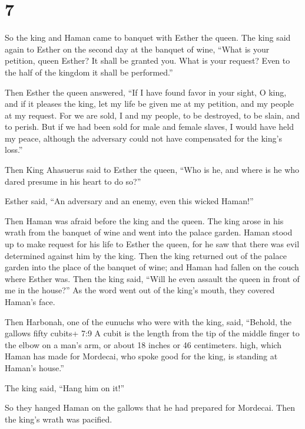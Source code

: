 \hypertarget{section-6}{%
\section{7}\label{section-6}}

 So the king and Haman came to banquet with Esther the
queen.  The king said again to Esther on the second day at
the banquet of wine, ``What is your petition, queen Esther? It shall be
granted you. What is your request? Even to the half of the kingdom it
shall be performed.''

 Then Esther the queen answered, ``If I have found favor in
your sight, O king, and if it pleases the king, let my life be given me
at my petition, and my people at my request.  For we are
sold, I and my people, to be destroyed, to be slain, and to perish. But
if we had been sold for male and female slaves, I would have held my
peace, although the adversary could not have compensated for the king's
loss.''

 Then King Ahasuerus said to Esther the queen, ``Who is he,
and where is he who dared presume in his heart to do so?''

 Esther said, ``An adversary and an enemy, even this wicked
Haman!''

Then Haman was afraid before the king and the queen.  The
king arose in his wrath from the banquet of wine and went into the
palace garden. Haman stood up to make request for his life to Esther the
queen, for he saw that there was evil determined against him by the
king.  Then the king returned out of the palace garden into
the place of the banquet of wine; and Haman had fallen on the couch
where Esther was. Then the king said, ``Will he even assault the queen
in front of me in the house?'' As the word went out of the king's mouth,
they covered Haman's face.

 Then Harbonah, one of the eunuchs who were with the king,
said, ``Behold, the gallows fifty cubits+ 7:9 A cubit is the length from
the tip of the middle finger to the elbow on a man's arm, or about 18
inches or 46 centimeters. high, which Haman has made for Mordecai, who
spoke good for the king, is standing at Haman's house.''

The king said, ``Hang him on it!''

 So they hanged Haman on the gallows that he had prepared
for Mordecai. Then the king's wrath was pacified.

